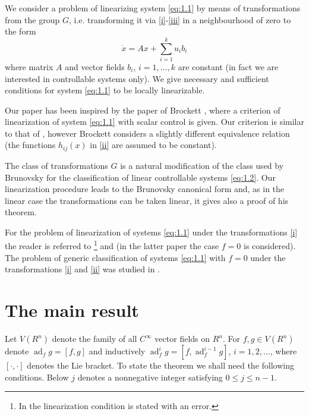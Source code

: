 \documentclass[leqno]{article}
\theoremstyle{plain}
\numberwithin{equation}{section}
\newcommand{\ad}{\operatorname{ad}}
\begin{document}
We consider a problem of linearizing system \eqref{eq:1.1} by means of transformations from the group $G$, i.e. transforming it via \eqref{i}-\eqref{iii} in a neighbourhood of zero to the form
\begin{equation} \label{eq:1.2}
	\dot{x}=A x+\sum_{i=1}^{k} u_{i} b_{i}
\end{equation}
where matrix $A$ and vector fields $b_{i}$, $i=1, \ldots, k$ are constant (in fact we are interested in controllable systems only). 
We give necessary and sufficient conditions for system \eqref{eq:1.1} to be locally linearizable. 

Our paper has been inspired by the paper of Brockett \cite{1}, where a criterion of linearization of system \eqref{eq:1.1} with scalar control is given. Our criterion is similar to that of \cite{1}, however Brockett considers a slightly different equivalence relation (the functions $h_{i j}(x)$ in \eqref{ii} are assumed to be constant).

The class of transformations $G$ is a natural modification of the class used by Brunovsky \cite{2} for the classification of linear controllable systems \eqref{eq:1.2}. 
Our linearization procedure leads to the Brunovsky canonical form and, as in the linear case the transformations can be taken linear, it gives also a proof of his theorem.

For the problem of linearization of systems \eqref{eq:1.1} under the transformations \eqref{i} the reader is referred to \cite{4}\footnote{In \cite{4} the linearization condition is stated with an error.} and \cite{5} (in the latter paper the case $f=0$ is considered). 
The problem of generic classification of systems \eqref{eq:1.1} with $f=0$ under the transformations \eqref{i} and \eqref{ii} was studied in \cite{3}.

\section{The main result}

Let $V\left(R^{n}\right)$ denote the family of all $C^{\infty}$ vector fields on $R^{n}$. For $f, g \in V\left(R^{n}\right)$ denote $\ad_{f} g=[f, g]$ and inductively $\ad_{f}^{i} g=[f, \ad_{f}^{i-1} g]$, $i=1,2,\dotsc$, where $[\cdot, \cdot]$ denotes the Lie bracket. 
To state the theorem we shall need the following conditions. Below $j$ denotes a nonnegative integer satisfying $0 \leqslant j \leqslant n-1$.
\end{document}
